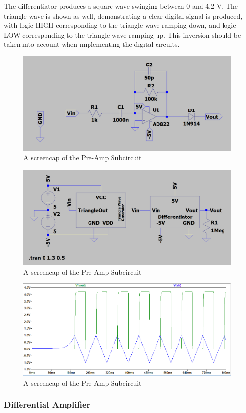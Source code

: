 The differentiator produces a square wave swinging between 0 and 4.2 V.
The triangle wave is shown as well, demonstrating a clear digital signal is produced, with logic HIGH corresponding to the triangle wave ramping down, and logic LOW corresponding to the triangle wave ramping up. 
This inversion should be taken into account when implementing the digital circuits.

\begin{figure}[H]
    \centering 
    \includegraphics[width=\textwidth]{../Circuits/Images/Differentiator/Schematic}
    \caption{A screencap of the Pre-Amp Subcircuit}
    \label{fig:differentiatorSchematic}
\end{figure}

\begin{figure}[H]
    \centering 
    \includegraphics[width=\textwidth]{../Circuits/Images/Differentiator/TestBench}
    \caption{A screencap of the Pre-Amp Subcircuit}
    \label{fig:differentiatorTestBench}
\end{figure}

\begin{figure}[H]
    \centering 
    \includegraphics[width=\textwidth]{../Circuits/Images/Differentiator/TestBenchWaveform}
    \caption{A screencap of the Pre-Amp Subcircuit}
    \label{fig:differentiatorTestBenchWaveform}
\end{figure}

\subsubsection{Differential Amplifier}
